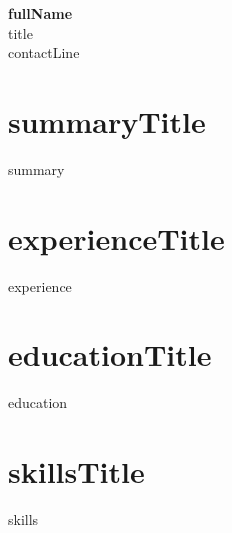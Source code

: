 \documentclass[11pt,a4paper]{article}
\begin{document}
\begin{center}
  {\LARGE\textbf{{{fullName}}}}\\[4pt]
  {{title}}\\[4pt]
  {{contactLine}}
\end{center}
\vspace{10pt}
\section*{{{summaryTitle}}}
{{summary}}
\section*{{{experienceTitle}}}
{{experience}}
\section*{{{educationTitle}}}
{{education}}
\section*{{{skillsTitle}}}
{{skills}}
\end{document}
